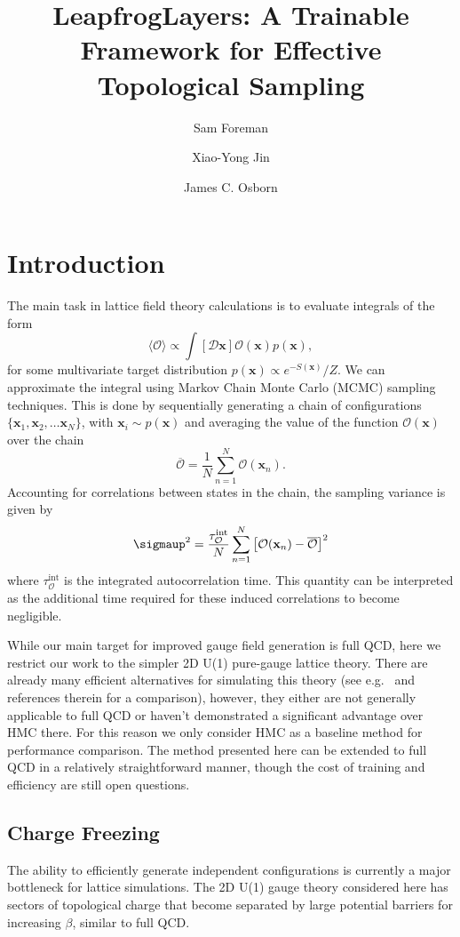 \documentclass[a4paper,11pt]{article}
\title{LeapfrogLayers: A Trainable Framework for Effective Topological Sampling}
\author*[a]{Sam Foreman}
\author[a,b]{Xiao-Yong Jin}
\author[a,b]{James C. Osborn}
\affiliation[a]{Leadership Computing Facility, Argonne National Laboratory,\\
  Lemont, IL, USA}
\affiliation[b]{Computational Science Division, Argonne National Laboratory,\\
  Lemont, IL, USA}
\newcommand{\x}{\mathbf{x}}
\begin{document}
\maketitle


\section{\label{sec:intro}Introduction}
%
The main task in lattice field theory calculations is to evaluate
integrals of the form
%
\begin{equation}
  \langle \mathcal{O} \rangle \propto
  \int \left[ \mathcal{D} \x \right] \mathcal{O}(\x) p(\x),
    \label{eq:density_integral}
\end{equation}
%
for some multivariate target distribution \(p(\x)\propto e^{-S(\x)}/Z\).
%
We can approximate the integral using Markov Chain Monte Carlo (MCMC) sampling
techniques.
%
This is done by sequentially generating a chain of configurations \(\{\x_{1},
\x_{2}, \ldots \x_{N}\}\), with \(\x_{i} \sim p(\x)\) and averaging the value of
the function \(\mathcal{O}(\x)\) over the chain
\begin{equation}
  \overline{\mathcal{O}} = \frac{1}{N} \sum_{n=1}^{N} \mathcal{O}(\x_n)  .
\end{equation}
%
Accounting for correlations between states in the chain, the sampling variance
is given by
%
\begin{equation}
  \sigmaup^{2} = \frac{\tau_{\mathcal{O}}^{\mathrm{int}}}{N}\sum_{n=1}^{N}
  \left[ \mathcal{O}(\x_n) - \overline{\mathcal{O}} \right]^2
\end{equation}
%
where \(\tau^{\mathrm{int}}_{\mathcal{O}}\) is the integrated autocorrelation
time.
%
This quantity can be interpreted as the additional time required for
these induced correlations to become negligible.

While our main target for improved gauge field generation is full QCD,
here we restrict our work to the simpler 2D U(1) pure-gauge lattice
theory.
There are already many efficient alternatives for simulating this theory
(see e.g.~\cite{Eichhorn:2021ccz} and references therein for a comparison),
however, they either are not generally applicable to full QCD
or haven't demonstrated a significant advantage over HMC there.
%
For this reason we only consider HMC as a baseline method for
performance comparison.
%
The method presented here can be extended to full QCD in a relatively
straightforward manner, though the cost of training and efficiency are
still open questions.
%
\subsection{\label{subsec:qfreezing}Charge Freezing}
%
The ability to efficiently generate independent configurations is currently
a major bottleneck for lattice simulations.
%
The 2D U(1) gauge theory considered here has sectors of topological charge that
become separated by large potential barriers for increasing $\beta$,
similar to full QCD.
\end{document}
